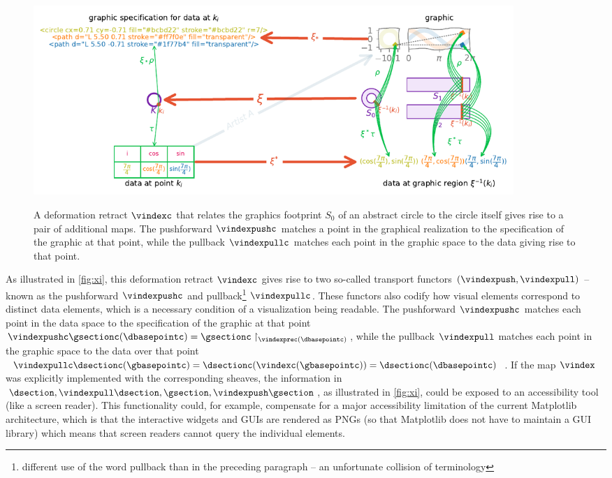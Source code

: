 \documentclass[preprint]{vgtc}
\begin{document}
\begin{figure}[h]
    \includegraphics[width=7.16in, alt={An annulus indexing space deformation retracts into a circle. For any point i, cos(i), sin(i), there is a specification to draw a piece of a circle, sine plot, and cosine plot, a  patch of pixels of a rendered circle, sin plot, and cosine plot. Hovering over any of those pixels should get back the data i, cos(i), sin(i)}]{xi_diagram.pdf}
    \caption{A deformation retract $\vindexc$ that relates the graphics footprint $S_0$ of an abstract circle to the circle itself gives rise to a pair of additional maps. The pushforward $\vindexpushc$ matches a point in the graphical realization to the specification of the graphic at that point, while the pullback $\vindexpullc$ matches each point in the graphic space to the data giving rise to that point.
    }
    \label{fig:xi}
\end{figure}

As illustrated in \autoref{fig:xi}, this deformation retract $\vindexc$ gives rise to two so-called transport functors $(\vindexpush, \vindexpull)$ -- known as the pushforward $\vindexpushc$ and pullback\footnote{different use of the word pullback than in the preceding paragraph -- an unfortunate collision of terminology} $\vindexpullc$. These functors also codify how visual elements correspond to distinct data elements, which is a necessary condition of a visualization being readable\cite{ziemkiewiczEmbeddingInformationVisualization2009}. The pushforward $\vindexpushc$ matches each point in the data space to the specification of the graphic at that point $\vindexpushc\gsectionc(\dbasepointc) = \gsectionc\restriction_{\vindexprec(\dbasepointc)}$, while the pullback $\vindexpull$ matches each point in the graphic space to the data over that point $\vindexpullc\dsectionc(\gbasepointc) = \dsectionc(\vindexc(\gbasepointc)) = \dsectionc(\dbasepointc)$. If the map $\vindex$ was explicitly implemented with the corresponding sheaves, the information in $\dsection, \vindexpull\dsection,\gsection, \vindexpush\gsection$, as illustrated in \autoref{fig:xi}, could be exposed to an accessibility tool (like a screen reader). This functionality could, for example, compensate for a major accessibility limitation of the current Matplotlib architecture, which is that the interactive widgets and GUIs are rendered as PNGs (so that Matplotlib does not have to maintain a GUI library) which means that screen readers cannot query the individual elements.
\end{document}
